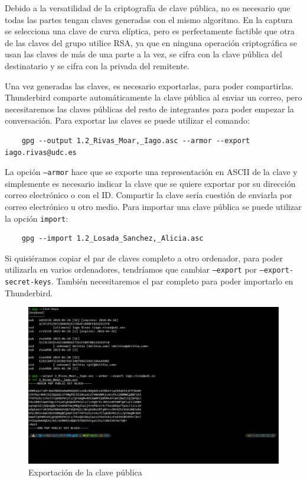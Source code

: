 Debido a la versatilidad de la criptografía de clave pública, no es necesario que todas las partes tengan claves generadas con el mismo algoritmo. En la captura se selecciona una clave de curva elíptica, pero es perfectamente factible que otra de las claves del grupo utilice RSA, ya que en ninguna operación criptográfica se usan las claves de más de una parte a la vez, se cifra con la clave pública del destinatario y se cifra con la privada del remitente.

Una vez generadas las claves, es necesario exportarlas, para poder compartirlas. Thunderbird comparte automáticamente la clave pública al enviar un correo, pero necesitaremos las claves públicas del resto de integrantes para poder empezar la conversación. Para exportar las claves se puede utilizar el comando:

\begin{verbatim}
    gpg --output 1.2_Rivas_Moar,_Iago.asc --armor --export iago.rivas@udc.es
\end{verbatim}

La opción \texttt{--armor} hace que se exporte una representación en ASCII de la clave y simplemente es necesario indicar la clave que se quiere exportar por su dirección correo electrónico o con el ID. Compartir la clave sería cuestión de enviarla por correo electrónico u otro medio. Para importar una clave pública se puede utilizar la opción \texttt{import}:

\begin{verbatim}
    gpg --import 1.2_Losada_Sanchez,_Alicia.asc
\end{verbatim}

Si quisiéramos copiar el par de claves completo a otro ordenador, para poder utilizarla en varios ordenadores, tendríamos que cambiar \texttt{--export} por \texttt{--export-secret-keys}. También necesitaremos el par completo para poder importarlo en Thunderbird.

\begin{figure}[H]
    \centering
    \includegraphics[width=\textwidth]{gpg-export.png}
    \caption{Exportación de la clave pública}
\end{figure}

